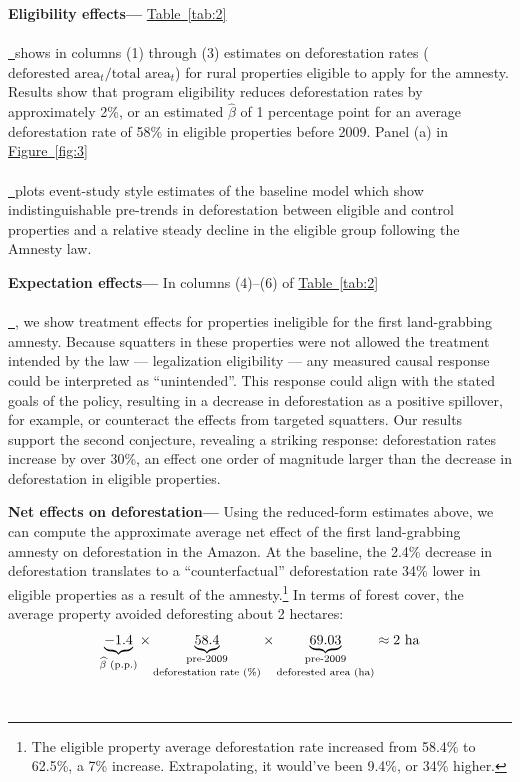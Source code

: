 \documentclass[12pt]{article}
\newcommand*{\figref}[2][]{%
  \hyperref[{fig:#2}]{%
    Figure~\ref*{fig:#2}%
    \ifx\\#1\\%
    \else
      \,#1%
    \fi
  }%
}
\newcommand*{\tabref}[2][]{%
  \hyperref[{tab:#2}]{%
    Table~\ref*{tab:#2}%
    \ifx\\#1\\%
    \else
      \,#1%
    \fi
  }%
}
\begin{document}
\quad \textbf{Eligibility effects---} \tabref{2} shows in columns (1) through (3) estimates on deforestation rates ($\text{deforested area}_t/\text{total area}_t$) for rural properties eligible to apply for the amnesty. Results show that program eligibility reduces deforestation rates by approximately 2\%, or an estimated $\widehat{\beta}$ of 1 percentage point for an average deforestation rate of 58\% in eligible properties before 2009. Panel (a) in \figref{3} plots event-study style estimates of the baseline model which show indistinguishable pre-trends in deforestation between eligible and control properties and a relative steady decline in the eligible group following the Amnesty law. 
\ 

\quad \textbf{Expectation effects---} In columns (4)--(6) of \tabref{2}, we show treatment effects for properties ineligible for the first land-grabbing amnesty. Because squatters in these properties were not allowed the treatment intended by the law --- legalization eligibility --- any measured causal response could be interpreted as ``unintended''. This response could align with the stated goals of the policy, resulting in a decrease in deforestation as a positive spillover, for example, or counteract the effects from targeted squatters. Our results support the second conjecture, revealing a striking response: deforestation rates increase by over 30\%, an effect one order of magnitude larger than the decrease in deforestation in eligible properties. 
\ 

\quad \textbf{Net effects on deforestation---} Using the reduced-form estimates above, we can compute the approximate average net effect of the first land-grabbing amnesty on deforestation in the Amazon. At the baseline, the 2.4\% decrease in deforestation translates to a ``counterfactual'' deforestation rate 34\% lower in eligible properties as a result of the amnesty.\footnote{The eligible property average deforestation rate increased from 58.4\% to 62.5\%, a 7\% increase. Extrapolating, it would've been 9.4\%, or 34\% higher.} In terms of forest cover, the average property avoided deforesting about 2 hectares: 
\begin{equation*}
    \underbrace{-1.4}_{\widehat{\beta} \text{ (p.p.)}}
    \times
    \underbrace{58.4}_{\shortstack{\scriptsize\text{pre-2009} \\ \scriptsize\text{deforestation rate (\%)}}}
    \times
    \underbrace{69.03}_{\shortstack{\scriptsize\text{pre-2009} \\ \scriptsize\text{deforested area (ha)}}}\approx2\text{ ha}
\end{equation*}
\ 
\end{document}
